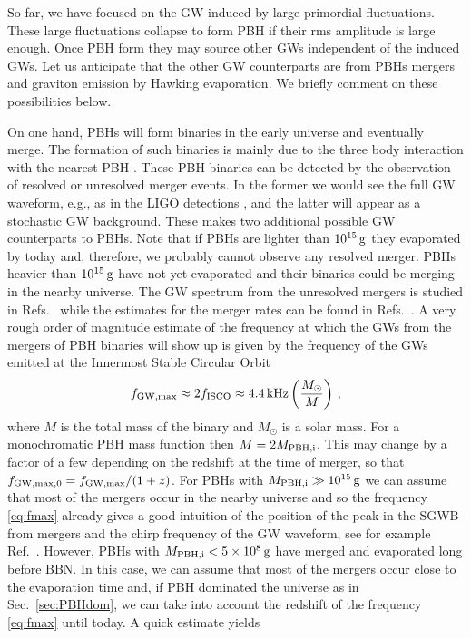 \documentclass[a4paper,11pt]{article}
\numberwithin{equation}{section}
\begin{document}
So far, we have focused on the GW induced by large primordial fluctuations. These large fluctuations collapse to form PBH if their rms amplitude is large enough. Once PBH form they may source other GWs independent of the induced GWs. Let us anticipate that the other GW counterparts are from PBHs mergers and graviton emission by Hawking evaporation. We briefly comment on these possibilities below.

On one hand, PBHs will form binaries in the early universe and eventually merge. The formation of such binaries is mainly due to the three body interaction with the nearest PBH \cite{Nakamura:1997sm}. These PBH binaries can be detected by the observation of resolved or unresolved merger events. In the former we would see the full GW waveform, e.g., as in the LIGO detections \cite{TheLIGOScientific:2017qsa}, and the latter will appear as a stochastic GW background. These makes two additional possible GW counterparts to PBHs. Note that if PBHs are lighter than $10^{15}\,{\rm g}$ they evaporated by today and, therefore, we probably cannot observe any resolved merger. PBHs heavier than $10^{15}\,{\rm g}$ have not yet evaporated and their binaries could be merging in the nearby universe. The GW spectrum from the unresolved mergers is studied in Refs.~\cite{Mandic:2016lcn,Wang:2016ana,Wang:2019kaf} while the estimates for the merger rates can be found in Refs.~\cite{Nakamura:1997sm,Sasaki:2016jop,Bird:2016dcv,Ali-Haimoud:2017rtz,Sasaki:2018dmp,Garriga:2019vqu}. A very rough order of magnitude estimate of the frequency at which the GWs from the mergers of PBH binaries will show up is given by the frequency of the GWs emitted at the Innermost Stable Circular Orbit \cite{Maggiore:1900zz}
\begin{align}\label{eq:fmax}
f_{\rm GW, max}\approx 2f_{\rm ISCO}\approx 4.4\,{\rm kHz}\left(\frac{M_{\odot}}{M}\right)\,,
\end{align}
where $M$ is the total mass of the binary and $M_\odot$ is a solar mass. For a monochromatic PBH mass function then $M=2M_{\rm PBH,i}$. This may change by a factor of a few depending on the redshift at the time of merger, so that $f_{\rm GW, max,0}=f_{\rm GW, max}/(1+z)$. For PBHs with $M_{\rm PBH,i}\gg 10^{15}\,{\rm g}$ we can assume that most of the mergers occur in the nearby universe and so the frequency \eqref{eq:fmax} already gives a good intuition of the position of the peak in the SGWB from mergers and the chirp frequency of the GW waveform, see for example Ref.~\cite{Wang:2019kaf}. However, PBHs with $M_{\rm PBH,i}<5\times 10^{8}\,{\rm g}$ have merged and evaporated long before BBN. In this case, we can assume that most of the mergers occur close to the evaporation time and, if PBH dominated the universe as in Sec.~\ref{sec:PBHdom}, we can take into account the redshift of the frequency \eqref{eq:fmax} until today. A quick estimate yields
\end{document}
